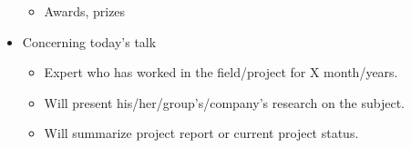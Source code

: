 \documentclass{article}
\begin{document}
\begin{itemize}
\begin{itemize}
\item Awards, prizes 
\end{itemize}

\item Concerning today's talk  


\begin{itemize}
\item Expert who has worked in the field/project for X month/years. 

\item Will present his/her/group's/company's research on the subject. 

\item Will summarize project report or current project status. 
\end{itemize}
\end{itemize}
\end{document}
